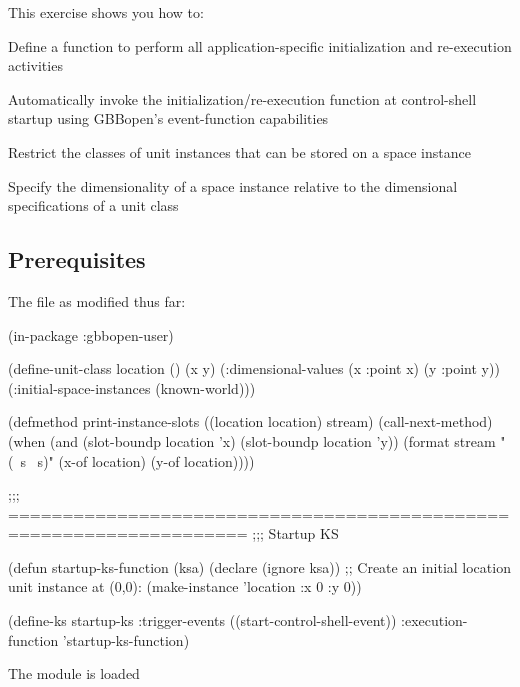 \documentclass[10pt,twoside,english,pdftex]{article}
\begin{document}
\fndocrule

This exercise shows you how to:
\begin{tightitemize}
\item Define a function to perform all application-specific
  initialization and re-execution activities
\item Automatically invoke the initialization/re-execution function at 
  control-shell startup using GBBopen's event-function capabilities
\item Restrict the classes of unit instances that can be stored on a space 
  instance
\item Specify the dimensionality of a space instance relative to the
  dimensional specifications of a unit class
\end{tightitemize}

\fndocrule

\subsection*{Prerequisites}

\begin{tightitemize}
\item The  file as modified thus far:
\end{tightitemize}
%
\W\supp
\begin{example}
  (in-package :gbbopen-user)

  (define-unit-class location ()
    (x y)
    (:dimensional-values
      (x :point x)
      (y :point y))
    (:initial-space-instances (known-world)))

  (defmethod print-instance-slots ((location location) stream)
    (call-next-method)
    (when (and (slot-boundp location 'x)
               (slot-boundp location 'y))
      (format stream " (~s ~s)"
              (x-of location)
              (y-of location))))

  ;;; ====================================================================
  ;;;   Startup KS

  (defun startup-ks-function (ksa)
    (declare (ignore ksa))
    ;; Create an initial location unit instance at (0,0):
    (make-instance 'location :x 0 :y 0))

  (define-ks startup-ks
      :trigger-events ((start-control-shell-event))
      :execution-function 'startup-ks-function)
\end{example}

\begin{tightitemize}
\item The  module is loaded
\end{tightitemize}
\end{document}
